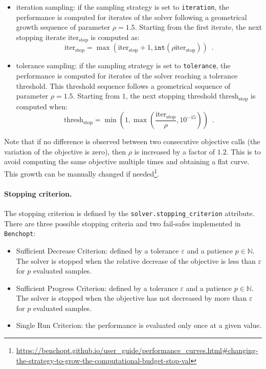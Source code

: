 \begin{itemize}
    \item iteration sampling: if the sampling strategy is set to \texttt{iteration}, the performance is computed for iterates of the solver following a geometrical growth sequence of parameter $\rho=1.5$. Starting from the first iterate, the next stopping iterate $\text{iter}_\text{stop}$ is computed as:
    \[\text{iter}_\text{stop} = \max(\text{iter}_\text{stop} + 1 , \texttt{int}(\rho \text{iter}_\text{stop})) \enspace.\]
    \item tolerance sampling: if the sampling strategy is set to \texttt{tolerance}, the performance is computed for iterates of the solver reaching a tolerance threshold. This threshold sequence follows a geometrical sequence of parameter $\rho=1.5$. Starting from $1$, the next stopping threshold $\text{thresh}_\text{stop}$ is computed when:
    \[\text{thresh}_\text{stop} = \min\left(1, \max\left(\frac{\text{iter}_\text{stop}}{\rho}, 10^{-15}\right)\right) \enspace.\]
\end{itemize}

Note that if no difference is observed between two consecutive objective calls (the variation of the objective is zero), then $\rho$ is increased by a factor of $1.2$. This is to avoid computing the same objective multiple times and obtaining a flat curve. This growth can be manually changed if needed\footnote{\url{https://benchopt.github.io/user\_guide/performance\_curves.html\#changing-the-strategy-to-grow-the-computational-budget-stop-val}}.

\paragraph{Stopping criterion.}
The stopping criterion is defined by the \texttt{solver.stopping\_criterion} attribute.
There are three possible stopping criteria and two fail-safes implemented in \texttt{Benchopt}:
\begin{itemize}
    \item Sufficient Decrease Criterion: defined by a tolerance $\varepsilon$ and a patience $p\in\mathbb{N}$. The solver is stopped when the relative decrease of the objective is less than $\varepsilon$ for $p$ evaluated samples.
    \item Sufficient Progress Criterion: defined by a tolerance $\varepsilon$ and a patience $p\in\mathbb{N}$. The solver is stopped when the objective has not decreased by more than $\varepsilon$ for $p$ evaluated samples.
    \item Single Run Criterion: the performance is evaluated only once at a given value.
\end{itemize}

